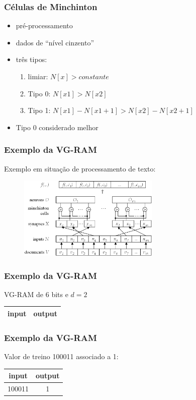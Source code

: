 \documentclass{beamer}
\begin{document}
\begin{frame}
    \frametitle{Células de Minchinton}
    \begin{itemize}
        \item pré-processamento
        \item dados de ``nível cinzento''
        \item três tipos:
            \begin{enumerate}
                \item limiar: $N[x] > constante$
                \item Tipo 0: $N[x1] > N[x2]$
                \item Tipo 1: $N[x1] - N[x1 + 1] > N[x2] - N[x2+1]$
            \end{enumerate}
        \item Tipo 0 considerado melhor
    \end{itemize}
\end{frame}
\begin{frame}
    \frametitle{Exemplo da VG-RAM}
    Exemplo em situação de processamento de texto:
    \begin{figure}[htb]
        \begin{center}
            \includegraphics[width=0.6\textwidth]{imagens/arquitetura}
        \end{center}
    \end{figure}
\end{frame}
\begin{frame}
    \frametitle{Exemplo da VG-RAM}
    VG-RAM de 6 bits e $d = 2$
    \begin{table}
        \centering
        \begin{tabular}{|c|c|}
            \hline
            input & output\\
            \hline
        \end{tabular}
    \end{table}
\end{frame}
\begin{frame}
    \frametitle{Exemplo da VG-RAM}
    Valor de treino 100011 associado a 1:
    \begin{table}
        \centering
        \begin{tabular}{|c|c|}
            \hline
             input &   output\\
            \hline
            100011 & \alert 1\\
            \hline
        \end{tabular}
    \end{table}
\end{frame}
\end{document}
